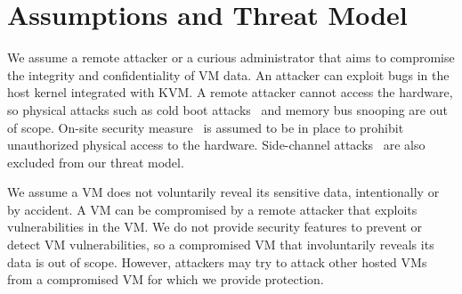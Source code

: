 \chapter{Assumptions and Threat Model}
\label{sec:threatmodel}

We assume a remote attacker or a curious administrator that aims to compromise
the integrity and confidentiality of VM data. An attacker can exploit bugs in
the host kernel integrated with KVM. A remote attacker cannot access the
hardware, so physical attacks such as cold boot attacks~\cite{coldboot}
and memory bus snooping are out of scope. On-site security
measure~\cite{googlesecuritywhitepaper} is assumed to be in place to prohibit
unauthorized physical access to the hardware.
Side-channel attacks~\cite{ristenpart09sc,zhang12sc,irazoqui15sc,zhang14sc,liu15sc,backes13sc}
are also excluded from our threat model.

We assume a VM does not voluntarily reveal its sensitive data, intentionally
or by accident. A VM can be compromised by a remote attacker that 
exploits vulnerabilities in the VM. We do not provide security features to 
prevent or detect VM vulnerabilities, so a compromised VM that involuntarily 
reveals its data is out of scope. However, attackers may try to attack 
other hosted VMs from a compromised VM for which we provide protection. 
